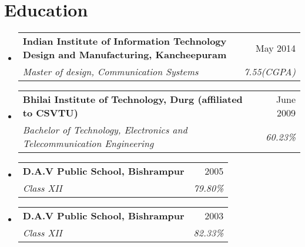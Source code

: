 \documentclass[letterpaper, 10pt]{article}
\makeatletter
\newcommand{\resumeSubheading}[4]{
	\vspace{-2pt}\item
	\begin{tabular*}{0.97\textwidth}[t]{l@{\extracolsep{\fill}}r}
		\textbf{#1} & #2 \\
		\textit{\small#3} & \textit{\small #4} \\
	\end{tabular*}\vspace{-7pt}
}
\newcommand{\resumeSubHeadingListStart}{\begin{itemize}[leftmargin=0.15in, label={}]}
\newcommand{\resumeSubHeadingListEnd}{\end{itemize}}
\makeatother
\begin{document}
	\section{Education}
	\resumeSubHeadingListStart
	
	\resumeSubheading
	{Indian Institute of Information Technology Design and Manufacturing, Kancheepuram}{May 2014}
	{Master of design, Communication Systems}{7.55(CGPA)}
	
	\resumeSubheading
	{Bhilai Institute of Technology, Durg  \footnotesize{(affiliated to CSVTU)}}{June 2009}{Bachelor of Technology, Electronics and Telecommunication Engineering}{60.23\%}
	
	\resumeSubheading
	{D.A.V Public School, Bishrampur}{2005}
	{Class XII}{79.80\%}
	
	\resumeSubheading
	{D.A.V Public School, Bishrampur}{2003}
	{Class XII}{82.33\%}
	
	\resumeSubHeadingListEnd		
	
		
\end{document}
